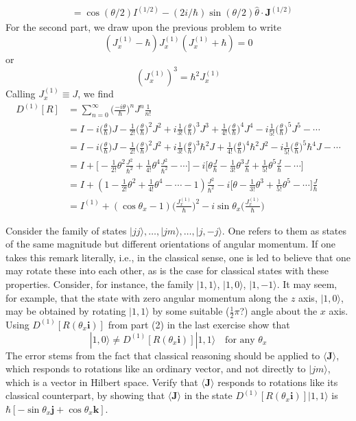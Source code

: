 \documentclass[../principles-of-quantum-mechanics.tex]{subfiles}
\begin{document}
\begin{questions}
\begin{solution}
\begin{align*}
				&= \cos(\theta/2)I^{(1/2)} - (2i/\hbar)\sin(\theta/2)\hat{\theta}\cdot\mathbf{J}^{(1/2)}
			\end{align*}
			For the second part, we draw upon the previous problem to write
			$$(J_x^{(1)} - \hbar)J_x^{(1)}(J_x^{(1)} + \hbar) = 0$$
			or
			$$(J_x^{(1)})^3 = \hbar^2J_x^{(1)}$$
			Calling $J_x^{(1)}\equiv J$, we find
			\begin{align*}
				D^{(1)}[R] &= \sum_{n=0}^{\infty}\Big({\frac{-i\theta}{\hbar}}\Big)^nJ^n\frac{1}{n!} \\
				&= I - i\Big(\frac{\theta}{\hbar}\Big)J - \frac{1}{2!}\Big(\frac{\theta}{\hbar}\Big)^2J^2 + i\frac{1}{3!}\Big(\frac{\theta}{\hbar}\Big)^3J^3 + \frac{1}{4!}\Big(\frac{\theta}{\hbar}\Big)^4J^4 - i\frac{1}{5!}\Big(\frac{\theta}{\hbar}\Big)^5J^5 - \cdots \\
				&= I - i\Big(\frac{\theta}{\hbar}\Big)J - \frac{1}{2!}\Big(\frac{\theta}{\hbar}\Big)^2J^2 + i\frac{1}{3!}\Big(\frac{\theta}{\hbar}\Big)^3\hbar^2J + \frac{1}{4!}\Big(\frac{\theta}{\hbar}\Big)^4\hbar^2J^2 - i\frac{1}{5!}\Big(\frac{\theta}{\hbar}\Big)^5\hbar^4J - \cdots \\
				&= I + \Big[-\frac{1}{2!}\theta^2\frac{J^2}{\hbar^2} + \frac{1}{4!}\theta^4\frac{J^2}{\hbar^2} - \cdots\Big] - i\Big[\theta\frac{J}{\hbar} - \frac{1}{3!}\theta^3\frac{J}{\hbar} + \frac{1}{5!}\theta^5\frac{J}{\hbar} - \cdots\Big] \\
				&= I + (1 - \frac{1}{2!}\theta^2 + \frac{1}{4!}\theta^4 - \cdots - 1)\frac{J^2}{\hbar^2} - i\Big[\theta - \frac{1}{3!}\theta^3 + \frac{1}{5!}\theta^5 - \cdots\Big]\frac{J}{\hbar} \\
				&= I^{(1)} + (\cos\theta_x - 1)\Big(\frac{J_x^{(1)}}{\hbar}\Big)^2 - i\sin\theta_x\Big(\frac{J_x^{(1)}}{\hbar}\Big)
			\end{align*}
		\end{solution}
	
		\question Consider the family of states $|jj\rangle,\dots,|jm\rangle,\dots,|j,-j\rangle$. One refers to them as states of the same magnitude but different orientations of angular momentum. If one takes this remark literally, i.e., in the classical sense, one is led to believe that one may rotate these into each other, as is the case for classical states with these properties. Consider, for instance, the family $|1, 1\rangle$, $|1, 0\rangle$, $|1, -1\rangle$. It may seem, for example, that the state with zero angular momentum along the $z$ axis, $|1, 0\rangle$, may be obtained by rotating $|1, 1\rangle$ by some suitable ($\tfrac{1}{2}\pi$?) angle about the $x$ axis. Using $D^{(1)}[R(\theta_x\mathbf{i})]$ from part (2) in the last exercise show that
		$$|1, 0\rangle \neq D^{(1)}[R(\theta_x\mathbf{i})]|1, 1\rangle\quad\text{for any }\theta_x$$
		The error stems from the fact that classical reasoning should be applied to $\langle\mathbf{J}\rangle$, which responds to rotations like an ordinary vector, and not directly to $|jm\rangle$, which is a vector in Hilbert space. Verify that $\langle\mathbf{J}\rangle$ responds to rotations like its classical counterpart, by showing that $\langle\mathbf{J}\rangle$ in the state $D^{(1)}[R(\theta_x\mathbf{i})]|1, 1\rangle$ is $\hbar[-\sin\theta_x\mathbf{j} + \cos\theta_x\mathbf{k}]$.
		

\end{questions}
\end{document}
